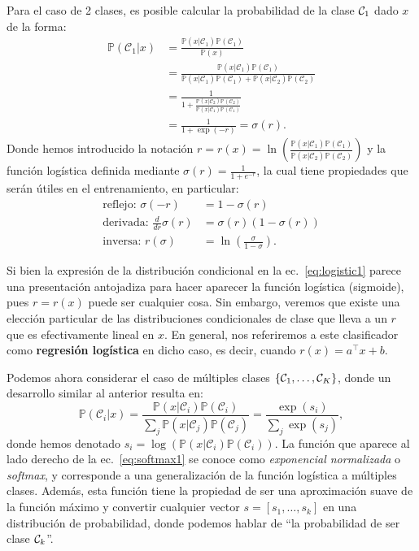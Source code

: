 Para el caso de 2 clases, es posible calcular la probabilidad de la clase ${\mathcal C}_1$ dado $x$ de la forma:
\begin{align}
	\mathbb{P}(\mathcal{C}_1|x) 
	&= \frac{\mathbb{P}(x|\mathcal{C}_1)\mathbb{P}(\mathcal{C}_1)}{\mathbb{P}(x)}\nonumber\\
	&= \frac{\mathbb{P}(x|\mathcal{C}_1)\mathbb{P}(\mathcal{C}_1)}{\mathbb{P}(x|\mathcal{C}_1)\mathbb{P}(\mathcal{C}_1)+\mathbb{P}(x|\mathcal{C}_2)\mathbb{P}(\mathcal{C}_2)}\nonumber\\
	&=\frac{1}{1+\frac{\mathbb{P}(x|\mathcal{C}_2)\mathbb{P}(\mathcal{C}_2)}{\mathbb{P}(x|\mathcal{C}_1)\mathbb{P}(\mathcal{C}_1)}}\nonumber\\
	&=\frac{1}{1+\exp(-r)} = \sigma(r).\label{eq:logistic1}
\end{align}
Donde hemos introducido la notación $r = r(x) =\ln\left(\frac{\mathbb{P}(x|\mathcal{C}_1)\mathbb{P}(\mathcal{C}_1)}{\mathbb{P}(x|\mathcal{C}_2)\mathbb{P}(\mathcal{C}_2)}\right)$  y la  función logística definida mediante $\sigma(r) = \frac{1}{1+e^{-r}}$, la cual  tiene propiedades que serán útiles en el entrenamiento, en particular:
\begin{align}
	\text{reflejo: }\sigma(-r)&=1-\sigma(r)\\
	\text{derivada: }\frac{d}{dr}\sigma(r)&=\sigma(r)(1-\sigma(r))\\
	\text{inversa: }r(\sigma)&=\ln\left(\frac{\sigma}{1-\sigma}\right).
\end{align}


\begin{remark} Si bien la expresión de la distribución condicional en la ec.~\eqref{eq:logistic1} parece una presentación antojadiza para hacer aparecer la  función logística (sigmoide), pues $r=r(x)$ puede ser cualquier cosa. Sin embargo, veremos que existe una elección particular de las distribuciones condicionales de clase que lleva a un $r$ que es efectivamente lineal en $x$. En general, nos  referiremos a este clasificador como \textbf{regresión logística} en dicho caso, es decir, cuando $r(x) = a^\top x  + b$.
\end{remark} 

Podemos ahora considerar el caso de múltiples clases $\{{\mathcal C}_1,\ldots,{\mathcal C}_K\}$, donde un desarrollo similar al anterior resulta en:  
\begin{equation}
	\mathbb{P}(\mathcal{C}_i | x) = \frac{\mathbb{P}(x | \mathcal{C}_i)\mathbb{P}(\mathcal{C}_i)}{\sum_{j}\mathbb{P}(x | \mathcal{C}_j)\mathbb{P}(\mathcal{C}_j)} = \frac{\exp(s_i)}{\sum_{j}\exp(s_j)},\label{eq:softmax1}  
\end{equation}
donde hemos denotado $s_i = \log\left(\mathbb{P}(x | \mathcal{C}_i)\mathbb{P}(\mathcal{C}_i)\right)$. La función que aparece al lado derecho de la  ec.~\eqref{eq:softmax1} se conoce como \emph{exponencial normalizada} o \emph{softmax}, y corresponde a una generalización de la función logística a múltiples clases. Además, esta función tiene la propiedad de ser una aproximación suave de la función máximo y convertir cualquier vector $s=[s_1,\ldots,s_k]$ en una distribución de probabilidad, donde podemos hablar de ``la probabilidad de ser clase ${\mathcal C}_k$''.

